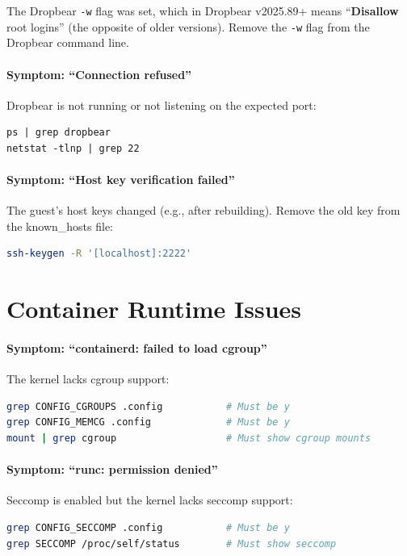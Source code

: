 The Dropbear \texttt{-w} flag was set, which in Dropbear v2025.89+
means ``\textbf{Disallow} root logins'' (the opposite of older versions).
Remove the \texttt{-w} flag from the Dropbear command line.

\paragraph{Symptom: ``Connection refused''}

Dropbear is not running or not listening on the expected port:
\begin{lstlisting}
ps | grep dropbear
netstat -tlnp | grep 22
\end{lstlisting}

\paragraph{Symptom: ``Host key verification failed''}

The guest's host keys changed (e.g., after rebuilding). Remove the old
key from the known\_hosts file:
\begin{lstlisting}[language=bash]
ssh-keygen -R '[localhost]:2222'
\end{lstlisting}

\section{Container Runtime Issues}

\paragraph{Symptom: ``containerd: failed to load cgroup''}

The kernel lacks cgroup support:
\begin{lstlisting}[language=bash]
grep CONFIG_CGROUPS .config           # Must be y
grep CONFIG_MEMCG .config             # Must be y
mount | grep cgroup                   # Must show cgroup mounts
\end{lstlisting}

\paragraph{Symptom: ``runc: permission denied''}

Seccomp is enabled but the kernel lacks seccomp support:
\begin{lstlisting}[language=bash]
grep CONFIG_SECCOMP .config           # Must be y
grep SECCOMP /proc/self/status        # Must show seccomp
\end{lstlisting}

